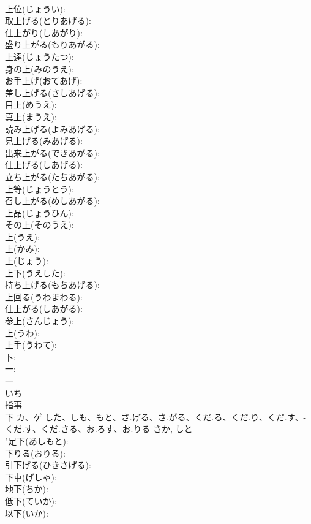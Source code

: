 \documentclass[8pt]{extreport}
\begin{document}
\begin{CJK}{UTF8}{min}
\\	上位(じょうい): 
\\	取上げる(とりあげる): 
\\	仕上がり(しあがり): 
\\	盛り上がる(もりあがる): 
\\	上達(じょうたつ): 
\\	身の上(みのうえ): 
\\	お手上げ(おてあげ): 
\\	差し上げる(さしあげる): 
\\	目上(めうえ): 
\\	真上(まうえ): 
\\	読み上げる(よみあげる): 
\\	見上げる(みあげる): 
\\	出来上がる(できあがる): 
\\	仕上げる(しあげる): 
\\	立ち上がる(たちあがる): 
\\	上等(じょうとう): 
\\	召し上がる(めしあがる): 
\\	上品(じょうひん): 
\\	その上(そのうえ): 
\\	上(うえ): 
\\	上(かみ): 
\\	上(じょう): 
\\	上下(うえした): 
\\	持ち上げる(もちあげる): 
\\	上回る(うわまわる): 
\\	仕上がる(しあがる): 
\\	参上(さんじょう): 
\\	上(うわ): 
\\	上手(うわて): 
\\	卜: 
\\	一: 
\\	一	
\\	いち	
\\	指事 
\\	下	カ、ゲ	した、しも、もと、さ.げる、さ.がる、くだ.る、くだ.り、くだ.す、-くだ.す、くだ.さる、お.ろす、お.りる	さか, しと	
\\	"足下(あしもと): 
\\	下りる(おりる): 
\\	引下げる(ひきさげる): 
\\	下車(げしゃ): 
\\	地下(ちか): 
\\	低下(ていか): 
\\	以下(いか): 

\end{CJK}
\end{document}
